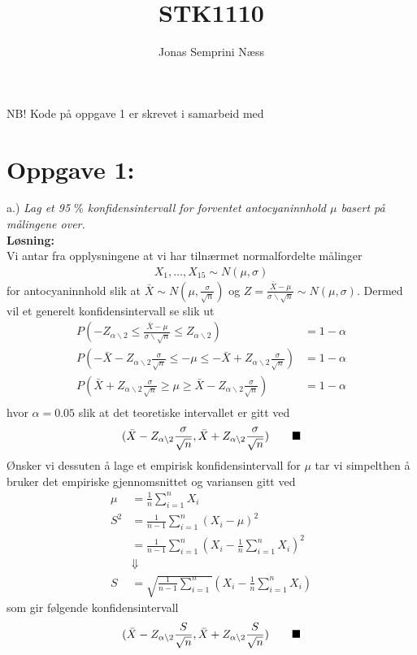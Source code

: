 \documentclass[12pt,
               a4paper,
               article,
               oneside,
               oldfontcommands,
               norsk]{memoir}
\title{STK1110}
\author{Jonas Semprini Næss}
\newcommand{\Q}{ \qquad \hfill \blacksquare}
\begin{document}
\maketitle
NB! Kode på oppgave 1 er skrevet i samarbeid med 
\section*{Oppgave 1:}
a.) \emph{Lag et 95 $\%$ konfidensintervall for forventet antocyaninnhold $\mu$ basert på
målingene over.} \vspace{4mm}\\ 
\textbf{Løsning:}\vspace{4mm}\\
Vi antar fra opplysningene at vi har tilnærmet normalfordelte målinger 
\begin{align*}
X_{1}, \ldots, X_{15} \sim N(\mu, \sigma)
\end{align*}
for antocyaninnhold slik at $\bar{X} \sim N(\mu, \frac{\sigma}{\sqrt{n}})$ og $Z = \frac{\bar{X} - \mu}{\sigma \backslash \sqrt{n}} \sim N(\mu, \sigma)$. Dermed vil et generelt konfidensintervall se slik ut
\begin{align*}
P(- Z_{\alpha \backslash 2} \leq \frac{\bar{X} - \mu}{\sigma \backslash \sqrt{n}} \leq Z_{\alpha \backslash 2}) &= 1 - \alpha \\[5pt]
P(- \bar{X} -Z_{\alpha \backslash 2}\frac{\sigma}{\sqrt{n}} \leq - \mu  \leq - \bar{X} + Z_{\alpha \backslash 2}\frac{\sigma}{\sqrt{n}}) &= 1 - \alpha \\[5pt]
P(\bar{X} + Z_{\alpha \backslash 2}\frac{\sigma}{\sqrt{n}} \geq  \mu  \geq \bar{X} - Z_{\alpha \backslash 2}\frac{\sigma}{\sqrt{n}}) &= 1 - \alpha \\[5pt]
\end{align*}
hvor $\alpha = 0.05$ slik at det teoretiske intervallet er gitt ved
\begin{align*}
    (\bar{X} - Z_{\alpha \backslash 2}\frac{\sigma}{\sqrt{n}}, \bar{X} + Z_{\alpha \backslash 2}\frac{\sigma}{\sqrt{n}}) \Q
\end{align*}
Ønsker vi dessuten å lage et empirisk konfidensintervall for $\mu$ tar vi simpelthen å bruker det empiriske gjennomsnittet og variansen gitt ved
\begin{align*}
    \mu &= \frac{1}{n} \sum_{i=1}^{n} X_{i} \\[5pt]
    S^2 &= \frac{1}{n-1} \sum_{i=1}^{n} \left(X_{i} - \mu \right)^2 \\[5pt]
        &= \frac{1}{n-1} \sum_{i=1}^{n} \left(X_{i} - \frac{1}{n} \sum_{i=1}^{n} X_{i} \right)^2 \\[5pt]
        &\Downarrow \\[5pt]
    S &=  \sqrt{\frac{1}{n-1} \sum_{i=1}^{n}}\left(X_{i} - \frac{1}{n} \sum_{i=1}^{n} X_{i} \right)
\end{align*}
som gir følgende konfidensintervall
\begin{align*}
    (\bar{X} - Z_{\alpha \backslash 2}\frac{S}{\sqrt{n}}, \bar{X} + Z_{\alpha \backslash 2}\frac{S}{\sqrt{n}}) \Q
\end{align*}
\end{document}
